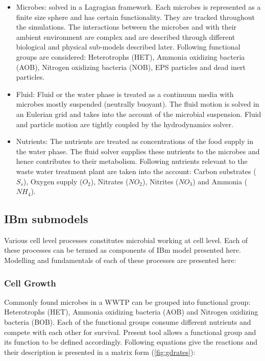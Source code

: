 \documentclass[11pt,a4paper,openright]{article}
\begin{document}
\begin{itemize}
\item Microbes: solved in a Lagragian framework. Each microbes is represented as a finite size sphere and has certain functionality. They are tracked throughout the simulations. The interactions between the microbes and with their ambient environment are complex and are described through different biological and physical sub-models described later. Following functional groups are considered: Heterotrophs (HET), Ammonia oxidizing bacteria (AOB), Nitrogen oxidizing bacteria (NOB), EPS particles and dead inert particles. 

\item Fluid: Fluid or the water phase is treated as a continuum media with microbes mostly suspended (neutrally buoyant). The fluid motion is solved in an Eulerian grid and takes into the account of the microbial suspension. Fluid and particle motion are tightly coupled by the hydrodynamics solver. 

\item Nutrients: The nutrients are treated as concentrations of the food supply in the water phase. The fluid solver supplies these nutrients to the microbes and hence contributes to their metabolism. Following nutrients relevant to the waste water treatment plant are taken into the account: Carbon substrates ($S_s$), Oxygen supply ($O_2$), Nitrates ($NO_{2}$), Nitrites ($NO_{3}$) and Ammonia ($NH_{4}$).
\end{itemize}

\subsection{IBm submodels}
Various cell level processes constitutes microbial working at cell level. Each of these processes can be termed as components of IBm model presented here. Modelling and fundamentals of each of these processes are presented here:

\subsubsection{Cell Growth}\label{growthmol}
Commonly found microbes in a WWTP can be grouped into functional group: Heterotrophs (HET), Ammonia oxidizing bacteria (AOB) and Nitrogen oxidizing bacteria (BOB). Each of the functional groups consume different nutrients and compete with each other for survival. Present tool allows a functional group and its function to be defined accordingly. Following equations give the reactions and their description is presented in a matrix form (\ref{fig:gdrates}):
\end{document}
